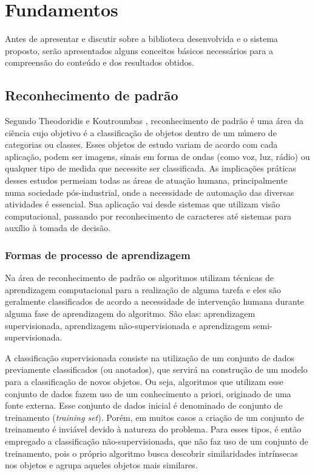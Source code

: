 \documentclass[a4paper,12pt]{article}
\begin{document}
\newpage
\section {Fundamentos}
\label {sec:fundamentos}
Antes de apresentar e discutir sobre a biblioteca desenvolvida e o sistema proposto, serão apresentados alguns conceitos básicos necessários para a compreensão do conteúdo e dos resultados obtidos.

\subsection{Reconhecimento de padrão}
\label{sec:reconhecimento_padrao}

Segundo Theodoridis e Koutroumbas  \cite{Koutroumbas06}, reconhecimento de padrão é uma área da ciência cujo objetivo é a classificação de objetos dentro de um número de categorias ou classes. Esses objetos de estudo variam de acordo com cada aplicação, podem ser imagens, sinais em forma de ondas (como voz, luz, rádio) ou qualquer tipo de medida que necessite ser classificada. As implicações práticas desses estudos permeiam todas as áreas de atuação humana, principalmente numa sociedade pós-industrial, onde a necessidade de automação das diversas atividades é essencial.  Sua aplicação vai desde sistemas que utilizam visão computacional, passando por reconhecimento de caracteres até sistemas para auxílio à tomada de decisão.

\subsubsection{Formas de processo de aprendizagem}
\label{sec:formas_processo_aprendizagem}

Na área de reconhecimento de padrão os algoritmos utilizam técnicas de aprendizagem computacional para a realização de alguma tarefa e eles são geralmente classificados de acordo a necessidade de intervenção humana durante alguma fase de aprendizagem do algoritmo. São elas: aprendizagem supervisionada,  aprendizagem não-supervisionada e aprendizagem semi-supervisionada.

A classificação supervisionada consiste na utilização de um conjunto de dados previamente classificados (ou anotados), que servirá na construção de um modelo para a classificação de novos objetos. Ou seja, algoritmos que utilizam esse conjunto de dados fazem uso de um conhecimento a priori, originado de uma fonte externa. Esse conjunto de dados inicial é denominado de conjunto de treinamento (\textit{training set}). Porém, em muitos casos a criação de um conjunto de treinamento é inviável devido à natureza do problema. Para esses tipos, é então empregado a classificação não-supervisionada, que não faz uso de um conjunto de treinamento, pois o próprio algoritmo busca descobrir similaridades intrínsecas nos objetos e agrupa aqueles objetos mais similares. \cite{Koutroumbas06, Jain99, Manning09}
\end{document}
